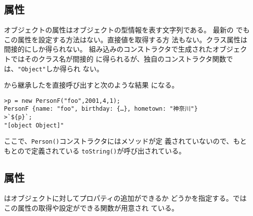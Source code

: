 \subsection{\protect{}属性}
オブジェクトの属性はオブジェクトの型情報を表す文字列である。
最新の \JS でもこの属性を設定する方法はない。直接値を取得する方
法もない。クラス属性は間接的にしか得られない。
組み込みのコンストラクタで生成されたオブジェクトではそのクラス名が間接的
に得られるが、独自のコンストラクタ関数では、\texttt{"Object"}しか得られ
ない。
\begin{Exec}\upshape\label{}
から継承したを直接呼び出すと次のような結果
になる。
\begin{Verbatim}
>p = new PersonF("foo",2001,4,1);
PersonF {name: "foo", birthday: {…}, hometown: "神奈川"}
>`${p}`;
"[object Object]"
\end{Verbatim}
ここで、\texttt{Person()}コンストラクタにはメソッドが定
義されていないので、もともとので定義されている
 \texttt{toString()}が呼び出されている。
\end{Exec}

\subsection{\protect{}属性}
はオブジェクトに対してプロパティの追加ができるか
どうかを指定する。\JS ではこの属性の取得や設定ができる関数が用意され
ている。


